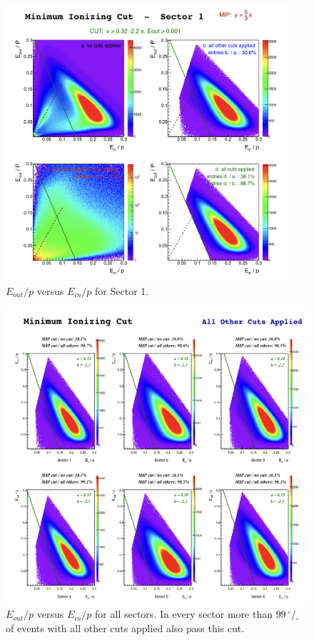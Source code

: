 \vspace{1cm}
\begin{figure}[h]
  \centering
		\includegraphics[width=0.93\textwidth]{img/cut-10EoVsEi_sector-1.png}
		\caption{$E_{out}/p$ versus $E_{in}/p$ for Sector 1.}
 		\label{fig:EoEi}
\end{figure}


\clearpage\newpage
\begin{figure}[t]
  \centering
		\includegraphics[width=1.00\textwidth]{img/cut-10EoVsEi_sector-all.png}
		\caption{$E_{out}/p$ versus $E_{in}/p$ for all sectors. In every sector
					more than $99\,^{\circ\!\!}/\!_\circ$ of events with all other cuts applied also pass this cut. }
 		\label{fig:EoEi_all}
\end{figure}


